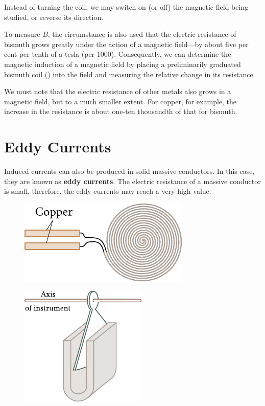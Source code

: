 Instead of turning the coil, we may switch on (or off) the magnetic field being studied, or reverse its direction.

To measure $B$, the circumstance is also used that the electric resistance of bismuth grows greatly under the action of a magnetic field---by about five per cent per tenth of a tesla (per \SI{1000}{\gauss}).
Consequently, we can determine the magnetic induction of a magnetic field by placing a preliminarily graduated bismuth coil () into the field and measuring the relative change in its resistance.

We must note that the electric resistance of other metals also grows in a magnetic field, but to a much smaller extent.
For copper, for example, the increase in the resistance is about one-ten thousandth of that for bismuth.

\section{Eddy Currents}\label{sec:8_4}

Induced currents can also be produced in solid massive conductors.
In this case, they are known as \textbf{eddy currents}.
The electric resistance of a massive conductor is small, therefore, the eddy currents may reach a very high value.

\begin{figure}[t]
	\begin{minipage}[t]{0.48\linewidth}
		\begin{center}
			\includegraphics[scale=1]{figures/ch_08/fig_8_5.pdf}
			\caption[]{}
			\label{fig:8_5}
		\end{center}
	\end{minipage}
	\hfill{ }%
	\begin{minipage}[t]{0.48\linewidth}
		\begin{center}
			\includegraphics[scale=1]{figures/ch_08/fig_8_6.pdf}
			\caption[]{}
			\label{fig:8_6}
		\end{center}
	\end{minipage}
\vspace{-0.4cm}
\end{figure}

